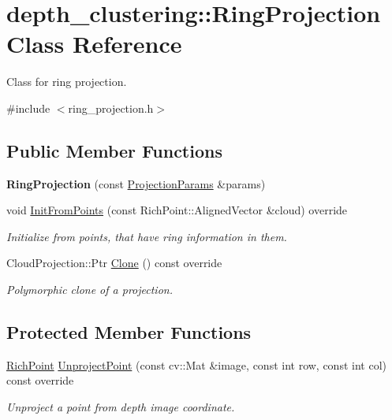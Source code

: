 \hypertarget{classdepth__clustering_1_1RingProjection}{}\section{depth\+\_\+clustering\+:\+:Ring\+Projection Class Reference}
\label{classdepth__clustering_1_1RingProjection}


Class for ring projection.  




{\ttfamily \#include $<$ring\+\_\+projection.\+h$>$}

\subsection*{Public Member Functions}
\begin{DoxyCompactItemize}
\item 
\mbox{\label{classdepth__clustering_1_1RingProjection_a112958f27f57bd68a76a96fe02914d50}} 
{\bfseries Ring\+Projection} (const \hyperlink{classdepth__clustering_1_1ProjectionParams}{Projection\+Params} \&params)
\item 
void \hyperlink{classdepth__clustering_1_1RingProjection_acfda4cfe9a0b80936987691fe44fc79c}{Init\+From\+Points} (const Rich\+Point\+::\+Aligned\+Vector \&cloud) override
\begin{DoxyCompactList}\small\item\em Initialize from points, that have ring information in them. \end{DoxyCompactList}\item 
Cloud\+Projection\+::\+Ptr \hyperlink{classdepth__clustering_1_1RingProjection_a433c0ee114b89b6c78ad4c471d120153}{Clone} () const override
\begin{DoxyCompactList}\small\item\em Polymorphic clone of a projection. \end{DoxyCompactList}\end{DoxyCompactItemize}
\subsection*{Protected Member Functions}
\begin{DoxyCompactItemize}
\item 
\hyperlink{classdepth__clustering_1_1RichPoint}{Rich\+Point} \hyperlink{classdepth__clustering_1_1RingProjection_a16cbf43e541e65560cb282c560b4efa7}{Unproject\+Point} (const cv\+::\+Mat \&image, const int row, const int col) const override
\begin{DoxyCompactList}\small\item\em Unproject a point from depth image coordinate. \end{DoxyCompactList}\end{DoxyCompactItemize}
